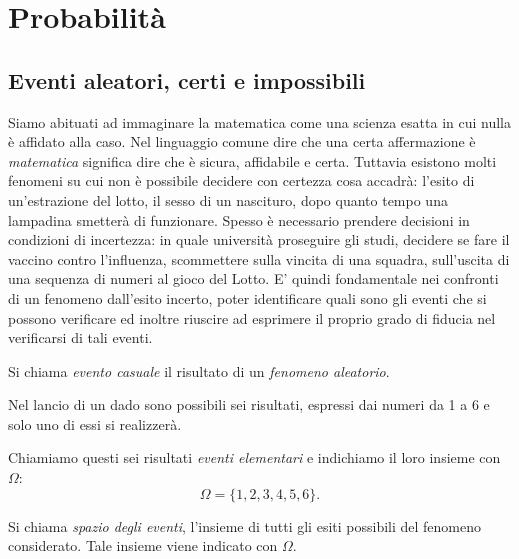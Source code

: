 
\chapter{Probabilità}


\section{Eventi aleatori, certi e impossibili}
\label{sec:01_intro}

Siamo abituati ad immaginare la matematica come una scienza esatta in cui nulla 
è affidato alla caso. Nel linguaggio comune dire che una certa affermazione è 
\emph{matematica} significa dire che è sicura, affidabile e certa. Tuttavia 
esistono molti fenomeni su cui non è possibile decidere con certezza cosa 
accadrà: l'esito di un'estrazione del lotto, il sesso di un nascituro, dopo 
quanto tempo una lampadina smetterà di funzionare. Spesso è necessario prendere 
decisioni in condizioni di incertezza: in quale università proseguire gli 
studi, decidere se fare il vaccino contro l'influenza, scommettere sulla vincita 
di una squadra, sull'uscita di una sequenza di numeri al gioco del Lotto. E' 
quindi fondamentale nei confronti di un fenomeno dall'esito incerto, poter 
identificare quali sono gli eventi che si possono verificare ed inoltre riuscire 
ad esprimere il proprio grado di fiducia nel verificarsi di tali eventi.

\begin{definizione}
Si chiama \emph{evento casuale} il risultato di un \emph{fenomeno aleatorio}.
\end{definizione}
Nel lancio di un dado sono possibili sei risultati, espressi dai numeri da 1 a 
6 
e solo uno di essi si realizzerà.

Chiamiamo questi sei risultati \emph{eventi elementari} e indichiamo il loro 
insieme con 
$\Omega:$ 
\[\Omega =\{1,2,3,4,5,6\}.\]

\begin{definizione}
Si chiama \emph{spazio degli eventi}, l'insieme di tutti gli esiti possibili 
del 
fenomeno considerato. Tale insieme viene indicato con $\Omega $.
\end{definizione}

